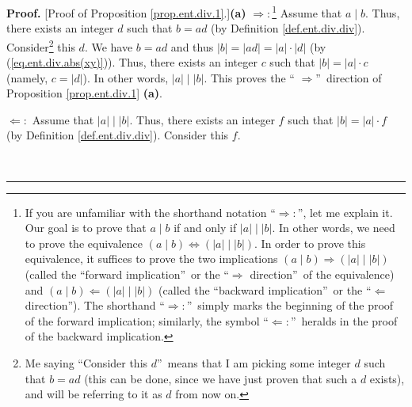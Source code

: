 \documentclass[numbers=enddot,12pt,final,onecolumn,notitlepage]{scrartcl}%
\numberwithin{exer}{subsection}
\theoremstyle{definition}
\newenvironment{proof}[1][Proof]{\noindent\textbf{#1.} }{\ \rule{0.5em}{0.5em}}
\begin{document}
\begin{proof}
[Proof of Proposition \ref{prop.ent.div.1}.]\textbf{(a)} $\Longrightarrow
:$\footnote{If you are unfamiliar with the shorthand notation
\textquotedblleft$\Longrightarrow:$\textquotedblright, let me explain it. Our
goal is to prove that $a\mid b$ if and only if $\left\vert a\right\vert
\mid\left\vert b\right\vert $. In other words, we need to prove the
equivalence $\left(  a\mid b\right)  \Longleftrightarrow\left(  \left\vert
a\right\vert \mid\left\vert b\right\vert \right)  $. In order to prove this
equivalence, it suffices to prove the two implications $\left(  a\mid
b\right)  \Longrightarrow\left(  \left\vert a\right\vert \mid\left\vert
b\right\vert \right)  $ (called the \textquotedblleft forward
implication\textquotedblright\ or the \textquotedblleft$\Longrightarrow$
direction\textquotedblright\ of the equivalence) and $\left(  a\mid b\right)
\Longleftarrow\left(  \left\vert a\right\vert \mid\left\vert b\right\vert
\right)  $ (called the \textquotedblleft backward
implication\textquotedblright\ or the \textquotedblleft$\Longleftarrow$
direction\textquotedblright). The shorthand \textquotedblleft$\Longrightarrow
:$\textquotedblright\ simply marks the beginning of the proof of the forward
implication; similarly, the symbol \textquotedblleft$\Longleftarrow
:$\textquotedblright\ heralds in the proof of the backward implication.}
Assume that $a\mid b$. Thus, there exists an integer $d$ such that $b=ad$ (by
Definition \ref{def.ent.div.div}). Consider\footnote{Me saying
\textquotedblleft Consider this $d$\textquotedblright\ means that I am picking
some integer $d$ such that $b=ad$ (this can be done, since we have just proven
that such a $d$ exists), and will be referring to it as $d$ from now on.} this
$d$. We have $b=ad$ and thus $\left\vert b\right\vert =\left\vert
ad\right\vert =\left\vert a\right\vert \cdot\left\vert d\right\vert $ (by
(\ref{eq.ent.div.abs(xy)})). Thus, there exists an integer $c$ such that
$\left\vert b\right\vert =\left\vert a\right\vert \cdot c$ (namely,
$c=\left\vert d\right\vert $). In other words, $\left\vert a\right\vert
\mid\left\vert b\right\vert $. This proves the \textquotedblleft%
$\Longrightarrow$\textquotedblright\ direction of Proposition
\ref{prop.ent.div.1} \textbf{(a)}.

$\Longleftarrow:$ Assume that $\left\vert a\right\vert \mid\left\vert
b\right\vert $. Thus, there exists an integer $f$ such that $\left\vert
b\right\vert =\left\vert a\right\vert \cdot f$ (by Definition
\ref{def.ent.div.div}). Consider this $f$.


\end{proof}
\end{document}
